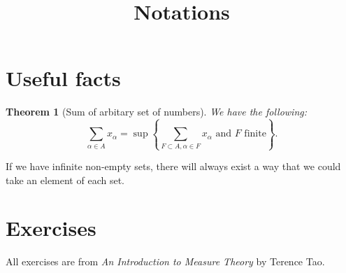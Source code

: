\documentclass[11pt,a4paper]{article}
\title{\textbf{Notations}}
\theoremstyle{definition}
\theoremstyle{plain}
\newtheorem{theorem}[definition]{Theorem}
\newcommand{\set}[1]{\left\{#1\right\}}
\begin{document}
\maketitle
\tableofcontents
\newpage

\section{Useful facts}

\begin{theorem}[Sum of arbitary set of numbers]
We have the following:
\[
\sum_{\alpha\in A}x_{\alpha} = \sup\set{\sum_{F\subset A,\alpha \in F}x_{\alpha} \text{ and } F \text{ finite}}.
\]
\end{theorem}


\begin{mynote}
If we have infinite non-empty sets, there will always exist a way that we could take an element of each set.
\end{mynote}


\section{Exercises}

All exercises are from \textit{An Introduction to Measure Theory} by Terence Tao.
\end{document}
